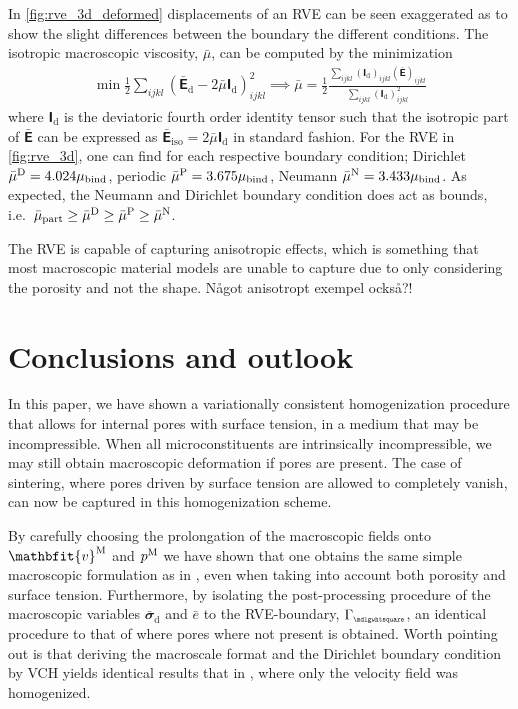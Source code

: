 \documentclass[12pt,a4paper]{article}
\renewcommand{\ta}[1]{\mathbfit{#1}}
\renewcommand{\ts}[1]{\mathbfit{#1}}
\renewcommand{\tf}[1]{\mathbfsfup{#1}}
\renewcommand{\Box}{\mdlgwhtsquare}
\renewcommand{\dev}{\mathrm{d}}
\newcommand{\ded}{\mathrm{d}}
\newcommand{\Periodic}{\mathrm{P}}
\newcommand{\particle}{\mathrm{part}}
\newcommand{\rve}{
  {\mathchoice
   {\mbox{\scalebox{0.67}{$\Box$}}}
   {\mbox{\scalebox{0.67}{$\Box$}}}
   {\mbox{\scalebox{0.5}{$\Box$}}}
   {\mbox{\scalebox{0.375}{$\Box$}}}
  }
}
\begin{document}
In \cref{fig:rve_3d_deformed} displacements of an RVE can be seen exaggerated as to show the slight differences between the boundary the different conditions.
The isotropic macroscopic viscosity, $\bar{\mu}$, can be computed by the minimization
\begin{align}
 \min \frac12 \sum_{ijkl} (\bar{\tf E}_\ded - 2 \bar{\mu} \tf I_\dev)_{ijkl}^2 \implies \bar{\mu} = \frac12 \frac{\sum_{ijkl}(\tf I_\dev)_{ijkl}(\bar{\tf E})_{ijkl}}{\sum_{ijkl} (\tf I_\dev)_{ijkl}^2}
\end{align}
where $\tf I_\dev$ is the deviatoric fourth order identity tensor such that the isotropic part of $\bar{\tf E}$ can be expressed as $\bar{\tf E}_{\mathrm{iso}} = 2 \bar{\mu} \tf I_\dev$ in standard fashion.
For the RVE in \cref{fig:rve_3d}, one can find for each respective boundary condition; Dirichlet $\bar{\mu}^{\mathrm{D}} = 4.024 \mu_{\mathrm{bind}}$, periodic $\bar{\mu}^\Periodic = 3.675\mu_\binder$, Neumann $\bar{\mu}^{\mathrm{N}} = 3.433\mu_{\mathrm{bind}}$.
As expected, the Neumann and Dirichlet boundary condition does act as bounds, i.e.\ $\bar{\mu}_\particle \geq \bar{\mu}^\Dirichlet \geq \bar{\mu}^\Periodic \geq \bar{\mu}^\Neumann$.


The RVE is capable of capturing anisotropic effects, which is something that most macroscopic material models are unable to capture due to only considering the porosity and not the shape.
Något anisotropt exempel också?!
\todo{***}


\section{Conclusions and outlook}

In this paper, we have shown a variationally consistent homogenization procedure that allows for internal pores with surface tension, in a medium that may be incompressible.
When all microconstituents are intrinsically incompressible, we may still obtain macroscopic deformation if pores are present.
The case of sintering, where pores driven by surface tension are allowed to completely vanish, can now be captured in this homogenization scheme.

By carefully choosing the prolongation of the macroscopic fields onto $\ta v^\macro$ and $p^{\mathrm{M}}$ we have shown that one obtains the same simple macroscopic formulation as in \cite{ohman_variationally_2014}, even when taking into account both porosity and surface tension.
Furthermore, by isolating the post-processing procedure of the macroscopic variables $\bar{\ts\sigma}_\dev$ and $\bar{e}$ to the RVE-boundary, $\Gamma_\rve$, an identical procedure to that of \cite{ohman_variationally_2014} where pores where not present is obtained.
Worth pointing out is that deriving the macroscale format and the Dirichlet boundary condition by VCH yields identical results that in \cite{ohman_computational_2013}, where only the velocity field was homogenized.
\end{document}
